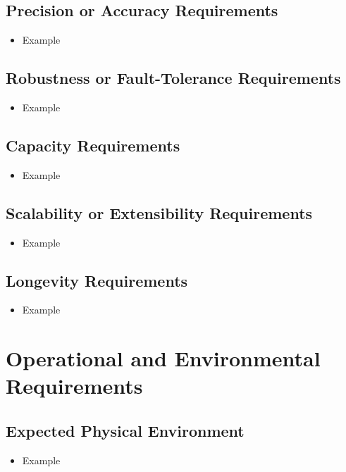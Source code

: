 \documentclass[12pt]{article}
\begin{document}
  \subsection{Precision or Accuracy Requirements}
    \begin{itemize}
      \item Example
    \end{itemize}

  \subsection{Robustness or Fault-Tolerance Requirements}
    \begin{itemize}
      \item Example
    \end{itemize}

  \subsection{Capacity Requirements}
    \begin{itemize}
      \item Example
    \end{itemize}

  \subsection{Scalability or Extensibility Requirements}
    \begin{itemize}
      \item Example
    \end{itemize}

  \subsection{Longevity Requirements}
    \begin{itemize}
      \item Example
    \end{itemize}

\section{Operational and Environmental Requirements}
  \subsection{Expected Physical Environment}
  \begin{itemize}
    \item Example
  \end{itemize}
\end{document}
